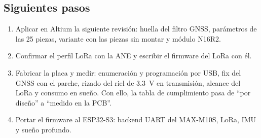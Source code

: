 \subsection{Siguientes pasos}

\begin{enumerate}
  \item Aplicar en Altium la siguiente revisión: huella del filtro GNSS, parámetros de las 25 piezas, variante con las piezas sin montar y módulo N16R2.
  \item Confirmar el perfil LoRa con la ANE y escribir el firmware del LoRa con él.
  \item Fabricar la placa y medir: enumeración y programación por USB, fix del GNSS con el parche, rizado del riel de 3.3~V en transmisión, alcance del LoRa y consumo en sueño. Con ello, la tabla de cumplimiento pasa de ``por diseño'' a ``medido en la PCB''.
  \item Portar el firmware al ESP32-S3: backend UART del MAX-M10S, LoRa, IMU y sueño profundo.
\end{enumerate}
